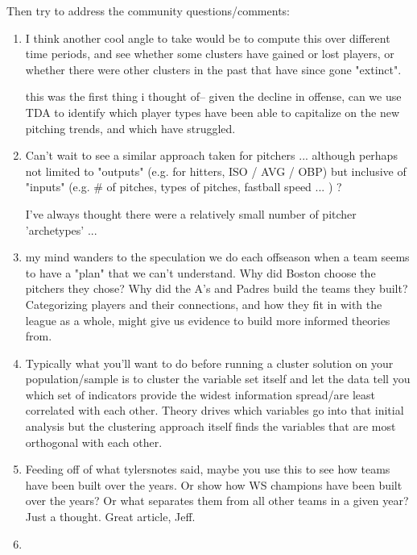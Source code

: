 \documentclass{article}
\begin{document}
Then try to address the community questions/comments:
\begin{enumerate}
    

    \item I think another cool angle to take would be to compute this over different time periods, and see whether some clusters have gained or lost players, or whether there were other clusters in the past that have since gone "extinct".
    
    this was the first thing i thought of-- given the decline in offense, can we use TDA to identify which player types have been able to capitalize on the new pitching trends, and which have struggled.
    
    \item Can't wait to see a similar approach taken for pitchers ... although perhaps not limited to "outputs" (e.g. for hitters, ISO / AVG / OBP) but inclusive of "inputs" (e.g. \# of pitches, types of pitches, fastball speed ... ) ?

    I've always thought there were a relatively small number of pitcher 'archetypes' ...

    \item my mind wanders to the speculation we do each offseason when a team seems to have a "plan" that we can't understand. Why did Boston choose the pitchers they chose? Why did the A's and Padres build the teams they built? Categorizing players and their connections, and how they fit in with the league as a whole, might give us evidence to build more informed theories from.

    \item Typically what you'll want to do before running a cluster solution on your population/sample is to cluster the variable set itself and let the data tell you which set of indicators provide the widest information spread/are least correlated with each other. Theory drives which variables go into that initial analysis but the clustering approach itself finds the variables that are most orthogonal with each other.
    
    \item Feeding off of what tylersnotes said, maybe you use this to see how teams have been built over the years. Or show how WS champions have been built over the years? Or what separates them from all other teams in a given year? Just a thought. Great article, Jeff.
    
    \item 
\end{enumerate}
\end{document}
